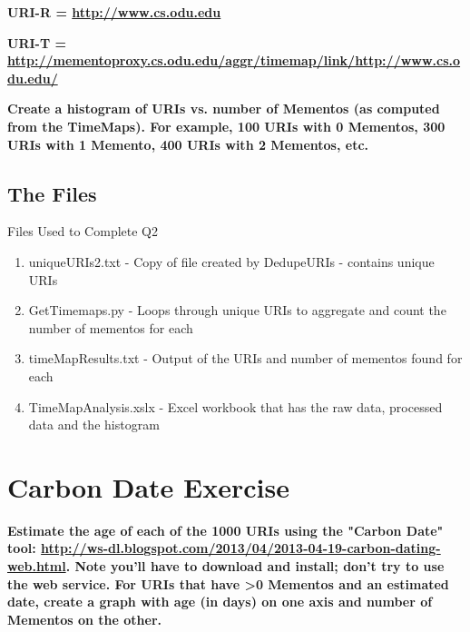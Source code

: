 \documentclass{article}
\begin{document}
\textbf{URI-R = \url{http://www.cs.odu.edu}}

\textbf{URI-T = \url{http://mementoproxy.cs.odu.edu/aggr/timemap/link/http://www.cs.odu.edu/}}

\textbf{Create a histogram of URIs vs. number of Mementos (as computed from the TimeMaps). For example, 100 URIs with 0 Mementos, 300 URIs with 1 Memento, 400 URIs with 2 Mementos, etc.}

\subsection*{The Files}
Files Used to Complete Q2

\begin{enumerate}
\item uniqueURIs2.txt - Copy of file created by DedupeURIs - contains unique URIs
\item GetTimemaps.py - Loops through unique URIs to aggregate and count the number of mementos for each
\item timeMapResults.txt - Output of the URIs and number of mementos found for each
\item TimeMapAnalysis.xslx - Excel workbook that has the raw data, processed data and the histogram
\end{enumerate}





\newpage

\section{Carbon Date Exercise}
\textbf{Estimate the age of each of the 1000 URIs using the "Carbon Date" tool: \url{http://ws-dl.blogspot.com/2013/04/2013-04-19-carbon-dating-web.html}. Note you'll have to download and install; don't try to use the web service. For URIs that have \textgreater  0 Mementos and an estimated date, create a graph with age (in days) on one axis and number of Mementos on the other.}

\begin{verbatim}

\end{verbatim}



\end{document}
